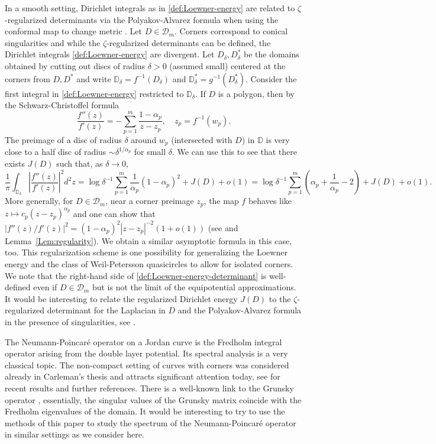 \documentclass{article}
\numberwithin{equation}{section}
\numberwithin{figure}{section}
\theoremstyle{plain}
\theoremstyle{plain}
\numberwithin{thm}{section}
\theoremstyle{remark}
\newcommand{\D}{\mathbb{D}}
\begin{document}
In a smooth setting, Dirichlet integrals as in \eqref{def:Loewner-energy} are related to $\zeta$-regularized determinants via the Polyakov-Alvarez formula when using the conformal map to change metric \cite{A}. Let $D \in \mathcal{D}_m$. Corners correspond to conical singularities and while the $\zeta$-regularized determinants can be defined, the Dirichlet integrals \eqref{def:Loewner-energy} are divergent. Let $D_\delta, D^*_\delta$ be the domains obtained by cutting out discs of radius $\delta > 0$ (assumed small) centered at the corners from $D, D^*$ and write $\D_\delta = f^{-1}(D_\delta)$ and  $\D^*_\delta = g^{-1}(D^*_\delta)$. Consider the first integral in \eqref{def:Loewner-energy} restricted to $\D_\delta$. If $D$ is a polygon, then by the Schwarz-Christoffel formula  
\[
\frac{f''(z)}{f'(z)} = -\sum_{p = 1}^m \frac{1-\alpha_p}{z-z_p}, \quad z_p=f^{-1}(w_p).
\]
The preimage of a disc of radius $\delta$ around $w_p$ (intersected with $D$) in $\D$ is very close to a half disc of radius $\sim \delta^{1/ \alpha_p}$ for small $\delta$. 
 We can use this to see that there exists $J(D)$ such that, as $\delta  \to 0$,
\[ \frac{1}{\pi}\int_{\D_\delta}\left|\frac{f''(z)}{f'(z)} \right|^2 d^2 z = \log \delta^{-1} \sum_{p=1}^m \frac{1}{\alpha_p}(1-\alpha_p)^2 + J(D) + o(1) = \log \delta^{-1} \sum_{p=1}^m  \left(\alpha_p + \frac{1}{\alpha_p} -2 \right) +J(D) + o(1).\]
More generally, for $D \in \mathcal{D}_m$, near a corner preimage $z_p$, the map $f$ behaves like $z \mapsto c_p (z-z_p)^{\alpha_p}$ and one can show that $|f''(z)/f'(z)|^2 = (1-\alpha_p)^2|z-z_p|^{-2}(1+o(1))$ (see \cite{Leh} and Lemma~\ref{Lem:regularity}). We obtain a similar asymptotic formula in this case, too. This regularization scheme is one possibility for generalizing the Loewner energy and the class of Weil-Petersson quasicircles to allow for isolated corners. We note that the right-hand side of \eqref{def:Loewner-energy-determinant} is well-defined even if $D \in \mathcal{D}_m$ but is not the limit of the equipotential approximations. It would be interesting to relate the regularized Dirichlet energy $J(D)$ to the $\zeta$-regularized determinant for the Laplacian in $D$ and the Polyakov-Alvarez formula in the presence of singularities, see \cite{sonoda, Kalvin, AKR}. 

 The Neumann-Poincar\'e operator on a Jordan curve is the Fredholm integral operator arising from the double layer potential. Its spectral analysis is a very classical topic. The non-compact setting of curves with corners was considered already in Carleman's thesis and attracts significant attention today, see \cite{PP} for recent results and further references. There is a well-known link to the Grunsky operator \cite{Schiffer81, TT}, essentially, the singular values of the Grunsky matrix coincide with the Fredholm eigenvalues of the domain. It would be interesting to try to use the methods of this paper to study the spectrum of the Neumann-Poincar\'e operator in similar settings as we consider here. 
\end{document}
